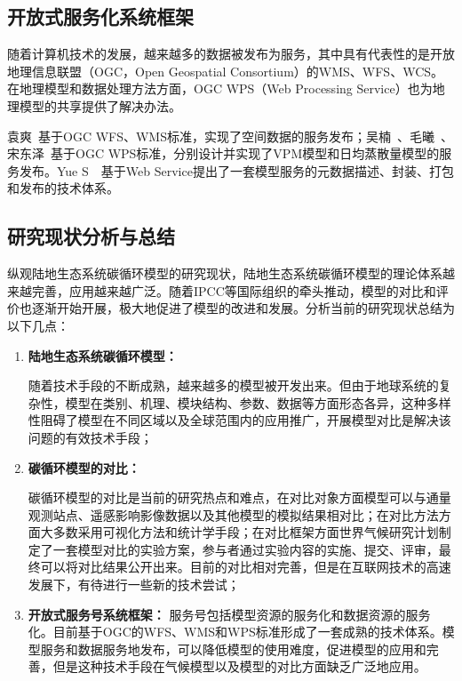 \subsection{开放式服务化系统框架}
随着计算机技术的发展，越来越多的数据被发布为服务，其中具有代表性的是开放地理信息联盟（OGC，Open Geospatial Consortium）的WMS、WFS、WCS。在地理模型和数据处理方法方面，OGC WPS（Web Processing Service）也为地理模型的共享提供了解决办法。 %

袁爽~\cite{袁爽2010空间数据}基于OGC WFS、WMS标准，实现了空间数据的服务发布；吴楠~\cite{吴楠2012基于}、毛曦~\cite{毛曦2012基于}、宋东泽~\cite{宋东泽2015一个生态传感网的}基于OGC WPS标准，分别设计并实现了VPM模型和日均蒸散量模型的服务发布。Yue S~\cite{Yue2013Key}~\cite{Yue2015A}基于Web Service提出了一套模型服务的元数据描述、封装、打包和发布的技术体系。

\subsection{研究现状分析与总结}
纵观陆地生态系统碳循环模型的研究现状，陆地生态系统碳循环模型的理论体系越来越完善，应用越来越广泛。随着IPCC等国际组织的牵头推动，模型的对比和评价也逐渐开始开展，极大地促进了模型的改进和发展。分析当前的研究现状总结为以下几点：

\begin{enumerate}[(1)]
\item \textbf{陆地生态系统碳循环模型：}

随着技术手段的不断成熟，越来越多的模型被开发出来。但由于地球系统的复杂性，模型在类别、机理、模块结构、参数、数据等方面形态各异，这种多样性阻碍了模型在不同区域以及全球范围内的应用推广，开展模型对比是解决该问题的有效技术手段；

\item \textbf{碳循环模型的对比：}

碳循环模型的对比是当前的研究热点和难点，在对比对象方面模型可以与通量观测站点、遥感影响影像数据以及其他模型的模拟结果相对比；在对比方法方面大多数采用可视化方法和统计学手段；在对比框架方面世界气候研究计划制定了一套模型对比的实验方案，参与者通过实验内容的实施、提交、评审，最终可以将对比结果公开出来。目前的对比相对完善，但是在互联网技术的高速发展下，有待进行一些新的技术尝试；

\item \textbf{开放式服务号系统框架：}
服务号包括模型资源的服务化和数据资源的服务化。目前基于OGC的WFS、WMS和WPS标准形成了一套成熟的技术体系。模型服务和数据服务地发布，可以降低模型的使用难度，促进模型的应用和完善，但是这种技术手段在气候模型以及模型的对比方面缺乏广泛地应用。
\end{enumerate}

